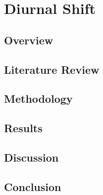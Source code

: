 \chapter{Diurnal Shift}
\label{chap:diurnalshift}
\section{Overview}
\section{Literature Review}
\section{Methodology}
\section{Results}
\section{Discussion}
\section{Conclusion}